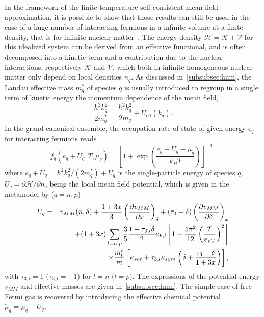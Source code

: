 In the framework of the finite temperature self-consistent mean-field
approximation, it is possible to show that those results can still be used in 
the case of a huge number of interacting fermions in a infinite volume at a 
finite density, that is for infinite nuclear matter~\cite{Vautherin1996}. 
The energy density $\mathcal{H} = \mathcal{K} + \mathcal{V}$ for this 
idealized system can be derived from an
effective functional, and is often decomposed into a kinetic term and a 
contribution due to the nuclear interactions, respectively $\mathcal{K}$ and 
$\mathcal{V}$, which both in infinite homogeneous nuclear matter only depend on
local densities $n_q$.
As discussed in~\ref{subsubsec:hnm}, the Landau effective mass $m_q^*$ of 
species $q$ is usually introduced to regroup in a single term of kinetic 
energy the momentum dependence of the mean field,
%
\begin{equation}
  \frac{\hbar^2 k_q^2}{2m_q^*} = \frac{\hbar^2 k_q^2}{2m_q} +
  U_{\text{eff}}(k_q).
\end{equation}
%
In the grand-canonical ensemble, the occupation rate of state of given energy
$e_q$ for interacting fermions reads
%
\begin{equation}
  f_q(e_q+U_q, T, \mu_q) 
  = \left[1+\exp\left(\frac{e_q + U_q - \mu_q}{k_B T}\right)\right]^{-1},
\end{equation}
%
where $e_q + U_q = \hbar^2 k_q^2/(2m_q^*) + U_q$ is the single-particle energy
of species $q$, $U_q = \partial\mathcal{H}/\partial n_q$ being the local mean
field potential, which is given in the metamodel by ($q=n,p$)
%
\begin{eqnarray}
  U_q &=& v_{MM}(n,\delta) + \frac{1+3x}{3}\left(\frac{\partial
  v_{MM}}{\partial x}\right)_{\delta}
  + (\tau_3 - \delta) 
  \left(\frac{\partial v_{MM}}{\partial \delta}\right)_x\notag\\
      &&+ (1+3x)\sum_{l=n,p}\frac{3}{5}\frac{1+\tau_{3,l}\delta}{2}
      e_{F,l}\left[1-\frac{5\pi^2}{12}\left(\frac{T}{e_{F,l}}\right)^2\right]
      \notag\\
      &&\times \frac{m_l^*}{m} \left[
        \kappa_{sat}+\tau_{3,l} \kappa_{sym} \left(\delta
        + \frac{\tau_3-\delta}{1+3x}\right)
    \right],
\end{eqnarray}
%
with $\tau_{3,l} = 1$ ($\tau_{3,l} = -1$) for $l=n$ ($l=p$). The expressions of
the potential energy $v_{MM}$ and effective masses are given 
in~\ref{subsubsec:hnm}. The simple case of free Fermi gas is recovered by 
introducing the effective chemical potential $\tilde{\mu}_q = \mu_q - U_q$,

